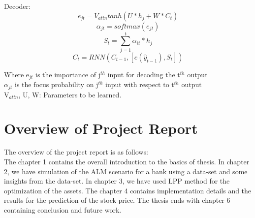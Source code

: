 Decoder: \begin{equation} e_{jt} = V_{attn} tanh(U * h_{j} + W * C_{t}) \end{equation}	
		 \begin{equation} \alpha_{jt} = softmax(e_{jt})  \end{equation}
		 \begin{equation} S_{t} = \sum_{j=1}^t\alpha_{it} * h_{j}  \end{equation}  
		 \begin{equation} C_{t} = RNN(C_{t-1}, [e(\hat{y}_{t-1}), S_{t}])  \end{equation} 

Where e$_{jt}$ is the importance of j$^{th}$ input for decoding the t$^{th}$ output  \\
$\alpha$$_{jt}$ is the focus probability on j$^{th}$ input with respect to t$^{th}$ output\\
V$_{attn}$, U, W: Parameters to be learned.
	


\section{Overview of Project Report}

The overview of the project report is as follows:\\
The chapter 1 contains the overall introduction to the basics of thesis. In chapter 2, we have simulation of the ALM scenario for a bank using a data-set and some insights from the data-set. In chapter 3, we have used LPP method for the optimization of the assets. The chapter 4 contains implementation details and the results for the prediction of the stock price. The thesis ends with chapter 6 containing conclusion and future work.









